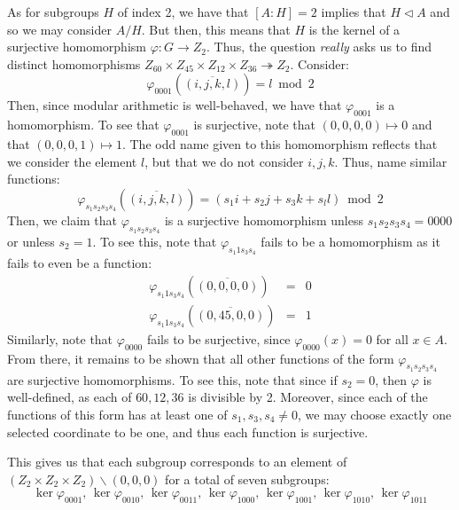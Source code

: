 \documentclass[10pt]{article}
\renewcommand{\phi}{\varphi}
\begin{document}
\begin{itemize}
As for subgroups $H$ of index 2, we have that $\left[A:H\right] = 2$
implies that $H\lhd A$ and so we may consider $A/H$. But then, this
means that $H$ is the kernel of a surjective homomorphism $\phi:G\to Z_{2}$.
Thus, the question \emph{really} asks us to find distinct homomorphisms
$Z_{60}\times Z_{45}\times Z_{12}\times Z_{36}\twoheadrightarrow Z_{2}$.
Consider:\[
\phi_{0001}\left(\overline{\left(i,j,k,l\right)}\right)=l\bmod2\]
Then, since modular arithmetic is well-behaved, we have that $\phi_{0001}$
is a homomorphism. To see that $\phi_{0001}$ is surjective, note
that $\left(0,0,0,0\right)\mapsto0$ and that $\left(0,0,0,1\right)\mapsto1$.
The odd name given to this homomorphism reflects that we consider
the element $l$, but that we do not consider $i,j,k$. Thus, name
similar functions:\[
\phi_{s_{1}s_{2}s_{3}s_{4}}\left(\overline{\left(i,j,k,l\right)}\right)=\left(s_{1}i+s_{2}j+s_{3}k+s_{l}l\right)\bmod2\]
Then, we claim that $\phi_{s_{1}s_{2}s_{3}s_{4}}$ is a surjective
homomorphism unless $s_{1}s_{2}s_{3}s_{4}=0000$ or unless $s_{2}=1$.
To see this, note that $\phi_{s_{1}1s_{3}s_{4}}$ fails to be a homomorphism
as it fails to even be a function:\begin{eqnarray*}
\phi_{s_{1}1s_{3}s_{4}}\left(\overline{\left(0,0,0,0\right)}\right) & = & 0\\
\phi_{s_{1}1s_{3}s_{4}}\left(\overline{\left(0,45,0,0\right)}\right) & = & 1\end{eqnarray*}
Similarly, note that $\phi_{0000}$ fails to be surjective, since
$\phi_{0000}\left(x\right)=0$ for all $x\in A$. From there, it remains
to be shown that all other functions of the form $\phi_{s_{1}s_{2}s_{3}s_{4}}$
are surjective homomorphisms. To see this, note that since if $s_{2}=0$,
then $\phi$ is well-defined, as each of $60,12,36$ is divisible
by 2. Moreover, since each of the functions of this form has at least
one of $s_{1},s_{3},s_{4}\ne0$, we may choose exactly one selected
coordinate to be one, and thus each function is surjective.

This gives us that each subgroup corresponds to an element of $\left(Z_{2}\times Z_{2}\times Z_{2}\right)\backslash\left(0,0,0\right)$
for a total of seven subgroups:\[
\ker\phi_{0001},\,\ker\phi_{0010},\,\ker\phi_{0011},\,\ker\phi_{1000},\,\ker\phi_{1001},\,\ker\phi_{1010},\,\ker\phi_{1011}\]
\end{itemize}

 
\end{document}
